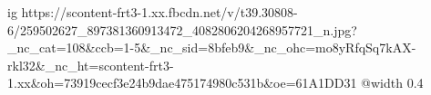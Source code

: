  
 
 
 
 

\ifcmt
  ig https://scontent-frt3-1.xx.fbcdn.net/v/t39.30808-6/259502627_897381360913472_4082806204268957721_n.jpg?_nc_cat=108&ccb=1-5&_nc_sid=8bfeb9&_nc_ohc=mo8yRfqSq7kAX-rkl32&_nc_ht=scontent-frt3-1.xx&oh=73919cecf3e24b9dae475174980c531b&oe=61A1DD31
  @width 0.4
\fi
